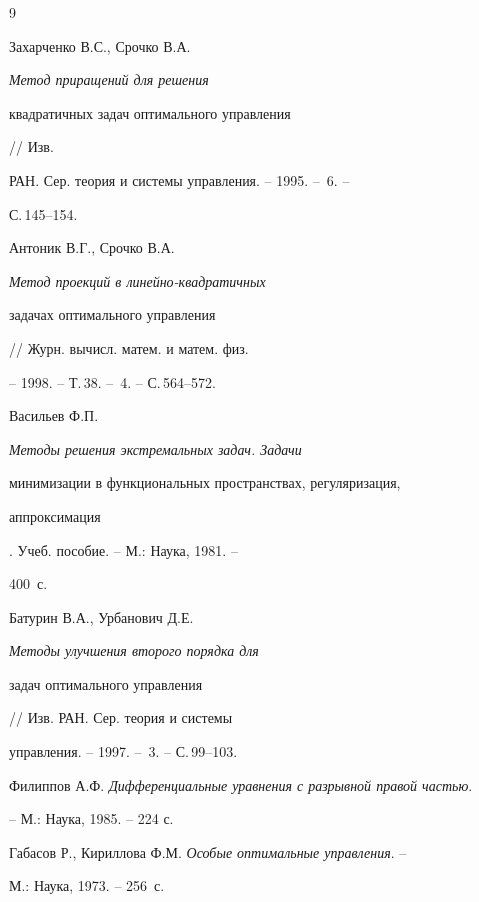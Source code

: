  


 


\begin{thebibliography}{9} 


 




Захарченко В.С., Срочко В.А. {\em Метод приращений для решения 


квадратичных задач оптимального управления} // Изв. 


РАН. Сер. теория и системы управления. -- 1995. -- \No\,6. -- 


С.\,145--154. 




Антоник В.Г., Срочко В.А. {\em Метод проекций в линейно-квадратичных 


задачах оптимального управления} // Журн. вычисл. матем. и матем. физ. 


-- 1998. -- Т.\,38. -- \No\,4. -- С.\,564--572. 




Васильев Ф.П. {\em Методы решения экстремальных задач. Задачи 


минимизации в функциональных пространствах, регуляризация, 


аппроксимация}. Учеб. пособие. -- М.: Наука, 1981. -- 


400~с. 




Батурин В.А., Урбанович Д.Е. {\em Методы улучшения второго порядка для 


задач оптимального управления} // Изв. РАН. Сер. теория и системы 


управления. -- 1997. -- \No\,3. -- С.\,99--103. 




Филиппов А.Ф. {\em Дифференциальные уравнения с разрывной правой частью}. 


-- М.: Наука, 1985. -- 224 с. 




Габасов Р., Кириллова Ф.М. {\em Особые оптимальные управления}. -- 


М.: Наука, 1973. -- 256~с. 


 


\end{thebibliography} 


 


\vskip 2cm 


 






 


\label{end} 


 


